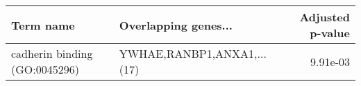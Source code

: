 \begin{tabular}{llr}
\toprule
                    Term name &       Overlapping genes... &  Adjusted p-value \\
\midrule
cadherin binding (GO:0045296) & YWHAE,RANBP1,ANXA1,...(17) &          9.91e-03 \\
\bottomrule
\end{tabular}
